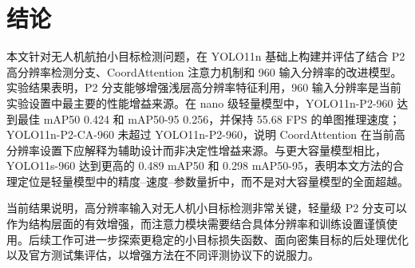 \documentclass[UTF8,a4paper,10.5pt,fontset=windows]{ctexart}
\newcommand{\YOLOBase}{\mbox{YOLO11n}}
\newcommand{\YOLOPtwoNine}{\mbox{YOLO11n-P2-960}}
\newcommand{\YOLOPtwoCANine}{\mbox{YOLO11n-P2-CA-960}}
\newcommand{\YOLOElevenS}{\mbox{YOLO11s}}
\newcommand{\CoordAtt}{\mbox{CoordAttention}}
\begin{document}
\section{结论}

本文针对无人机航拍小目标检测问题，在 \YOLOBase{} 基础上构建并评估了结合 P2 高分辨率检测分支、\CoordAtt{} 注意力机制和 960 输入分辨率的改进模型。实验结果表明，P2 分支能够增强浅层高分辨率特征利用，960 输入分辨率是当前实验设置中最主要的性能增益来源。在 nano 级轻量模型中，\YOLOPtwoNine{} 达到最佳 mAP50 0.424 和 mAP50-95 0.256，并保持 55.68 FPS 的单图推理速度；\YOLOPtwoCANine{} 未超过 \YOLOPtwoNine{}，说明 \CoordAtt{} 在当前高分辨率设置下应解释为辅助设计而非决定性增益来源。与更大容量模型相比，\YOLOElevenS{}-960 达到更高的 0.489 mAP50 和 0.298 mAP50-95，表明本文方法的合理定位是轻量模型中的精度--速度--参数量折中，而不是对大容量模型的全面超越。

当前结果说明，高分辨率输入对无人机小目标检测非常关键，轻量级 P2 分支可以作为结构层面的有效增强，而注意力模块需要结合具体分辨率和训练设置谨慎使用。后续工作可进一步探索更稳定的小目标损失函数、面向密集目标的后处理优化以及官方测试集评估，以增强方法在不同评测协议下的说服力。
\end{document}
